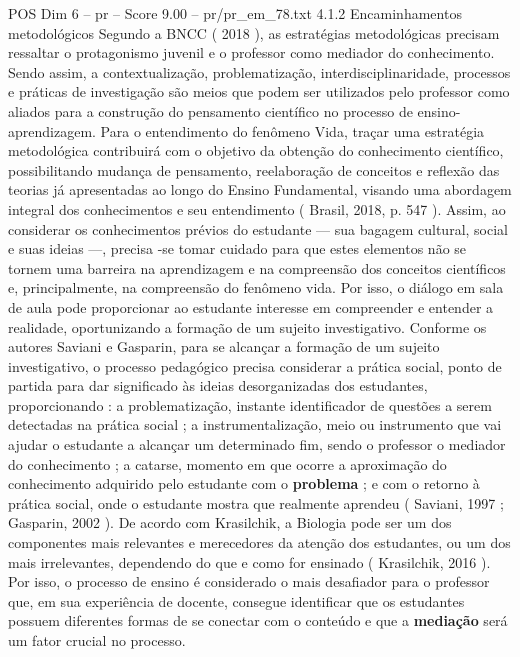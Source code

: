 \begin{textsample}{POS Dim 6 – pr – Score 9.00 – pr/pr\_em\_78.txt}  \label{ex:f6_pos_024}
4.1.2 Encaminhamentos metodológicos Segundo a BNCC ( 2018 ), as estratégias metodológicas precisam ressaltar o protagonismo juvenil e o professor como mediador do conhecimento.
Sendo assim, a contextualização, problematização, interdisciplinaridade, processos e práticas de investigação são meios que podem ser utilizados pelo professor como aliados para a construção do pensamento científico no processo de ensino-aprendizagem.
Para o entendimento do fenômeno Vida, traçar uma estratégia metodológica contribuirá com o objetivo da obtenção do conhecimento científico, possibilitando mudança de pensamento, reelaboração de conceitos e reflexão das teorias já apresentadas ao longo do Ensino Fundamental, visando uma abordagem integral dos conhecimentos e seu entendimento ( Brasil, 2018, p. 547 ).
Assim, ao considerar os conhecimentos prévios do estudante — sua bagagem cultural, social e suas ideias —, precisa -se tomar cuidado para que estes elementos não se tornem uma barreira na aprendizagem e na compreensão dos conceitos científicos e, principalmente, na compreensão do fenômeno vida.
Por isso, o diálogo em sala de aula pode proporcionar ao estudante interesse em compreender e entender a realidade, oportunizando a formação de um sujeito investigativo.
Conforme os autores Saviani e Gasparin, para se alcançar a formação de um sujeito investigativo, o processo pedagógico precisa considerar a prática social, ponto de partida para dar significado às ideias desorganizadas dos estudantes, proporcionando : a problematização, instante identificador de questões a serem detectadas na prática social ; a instrumentalização, meio ou instrumento que vai ajudar o estudante a alcançar um determinado fim, sendo o professor o mediador do conhecimento ; a catarse, momento em que ocorre a aproximação do conhecimento adquirido pelo estudante com o \textbf{problema} ; e com o retorno à prática social, onde o estudante mostra que realmente aprendeu ( Saviani, 1997 ; Gasparin, 2002 ).
De acordo com Krasilchik, a Biologia pode ser um dos componentes mais relevantes e merecedores da atenção dos estudantes, ou um dos mais irrelevantes, dependendo do que e como for ensinado ( Krasilchik, 2016 ).
Por isso, o processo de ensino é considerado o mais desafiador para o professor que, em sua experiência de docente, consegue identificar que os estudantes possuem diferentes formas de se conectar com o conteúdo e que a \textbf{mediação} será um fator crucial no processo.

\end{textsample}
